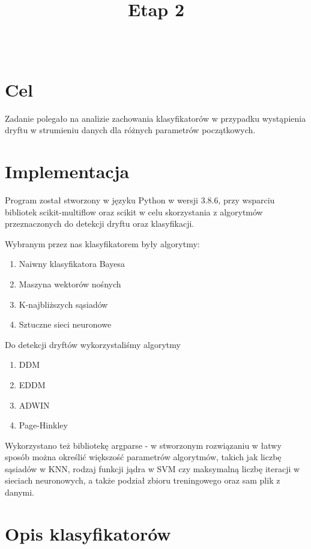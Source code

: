 \documentclass{classrep}
\author{%
  \studentinfo{Paweł Galewicz}{234053}\\
  \studentinfo{Karol Podlewski}{234106}%
}
\title{Etap 2}
\begin{document}
\maketitle


\tableofcontents
{}
\newpage

\section{Cel}

Zadanie polegało na analizie zachowania klasyfikatorów w przypadku wystąpienia dryftu w strumieniu danych dla różnych parametrów początkowych. 

\section{Implementacja}

Program został stworzony w języku Python w wersji 3.8.6, przy wsparciu bibliotek scikit-multiflow oraz scikit w celu skorzystania z algorytmów przeznaczonych do detekcji dryftu oraz klasyfikacji.

Wybranym przez nas klasyfikatorem były algorytmy:
\begin{enumerate}
    \item Naiwny klasyfikatora Bayesa
    \item Maszyna wektorów nośnych
    \item K-najbliższych sąsiadów
    \item Sztuczne sieci neuronowe
\end{enumerate}

Do detekcji dryftów wykorzystaliśmy algorytmy 
\begin{enumerate}
    \item DDM
    \item EDDM
    \item ADWIN
    \item Page-Hinkley
\end{enumerate}

Wykorzystano też bibliotekę argparse - w stworzonym rozwiązaniu w łatwy sposób można określić większość parametrów algorytmów, takich jak liczbę sąsiadów w KNN, rodzaj funkcji jądra w SVM czy maksymalną liczbę iteracji w sieciach neuronowych, a także podział zbioru treningowego oraz sam plik z danymi.

\section{Opis klasyfikatorów}
\end{document}
